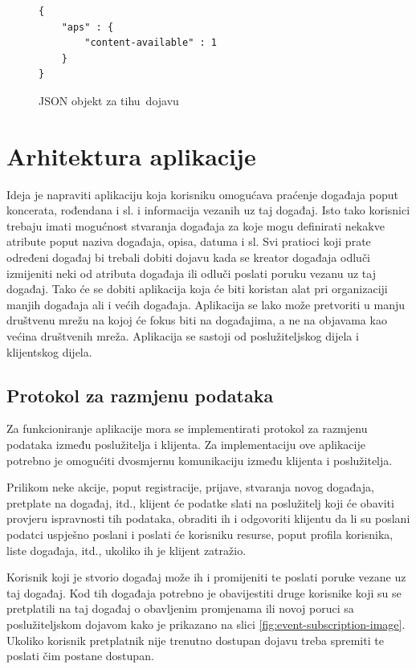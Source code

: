 \documentclass[times, utf8, zavrsni]{fer}
\begin{document}
{\begin{figure}[t!]
\begin{lstlisting}
{
    "aps" : {
        "content-available" : 1
    }
}
\end{lstlisting}
\caption{JSON objekt za \glqq tihu\grqq\  dojavu}
\label{lst:tiha-dojava}
\end{figure}

\chapter{Arhitektura aplikacije}
\label{chp:architecture}

Ideja je napraviti aplikaciju koja korisniku omogućava praćenje događaja poput koncerata, rođendana i sl. i informacija vezanih uz taj događaj. Isto tako korisnici trebaju imati mogućnost stvaranja događaja za koje mogu definirati nekakve atribute poput naziva događaja, opisa, datuma i sl. Svi pratioci koji prate određeni događaj bi trebali dobiti dojavu kada se kreator događaja odluči izmijeniti neki od atributa događaja ili odluči poslati poruku vezanu uz taj događaj. Tako će se dobiti aplikacija koja će biti koristan alat pri organizaciji manjih događaja ali i većih događaja. Aplikacija se lako može pretvoriti u manju društvenu mrežu na kojoj će fokus biti na događajima, a ne na objavama kao većina društvenih mreža. Aplikacija se sastoji od poslužiteljskog dijela i klijentskog dijela.

\section{Protokol za razmjenu podataka}
Za funkcioniranje aplikacije mora se implementirati protokol za razmjenu podataka između poslužitelja i klijenta. Za implementaciju ove aplikacije potrebno je omogućiti dvosmjernu komunikaciju između klijenta i poslužitelja.

Prilikom neke akcije, poput registracije, prijave, stvaranja novog događaja, pretplate na događaj, itd., klijent će podatke slati na poslužitelj koji će obaviti provjeru ispravnosti tih podataka, obraditi ih i odgovoriti klijentu da li su poslani podatci uspješno poslani i poslati će korisniku resurse, poput profila korisnika, liste događaja, itd., ukoliko ih je klijent zatražio.

Korisnik koji je stvorio događaj može ih i promijeniti te poslati poruke vezane uz taj događaj. Kod tih događaja potrebno je obavijestiti druge korisnike koji su se pretplatili na taj događaj o obavljenim promjenama ili novoj poruci sa poslužiteljskom dojavom kako je prikazano na slici \ref{fig:event-subscription-image}. Ukoliko korisnik pretplatnik nije trenutno dostupan dojavu treba spremiti te poslati čim postane dostupan.

}
\end{document}
